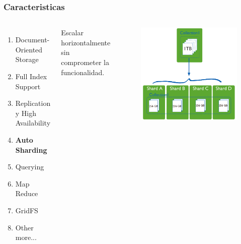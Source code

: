 \documentclass{beamer}
\begin{document}
\begin{frame}
\frametitle{Caracteristicas}
\begin{columns}[c] %

\begin{enumerate}
\item Document-Oriented Storage
\item Full Index Support
\item Replication y High Availability
\item \textbf{Auto Sharding}
\item Querying
\item Map Reduce
\item GridFS
\item Other more...
\end{enumerate}

Escalar horizontalmente sin comprometer la funcionalidad.
\begin{figure}
\includegraphics[width=0.8\linewidth]{sharded-collection.png}
\end{figure}
\end{columns}
\end{frame}
\end{document}
